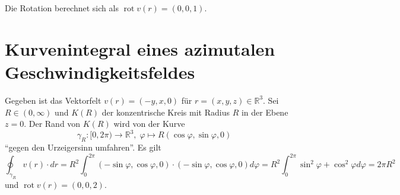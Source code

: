 \documentclass[11pt]{article}
\theoremstyle{plain}
\theoremstyle{definition}
\newcommand{\R}{\mathbb{R}}
\newcommand{\ph}{\varphi}
\newcommand{\longto}{\longrightarrow}
\newcommand{\rot}{\operatorname{rot}}
\begin{document}
Die Rotation berechnet sich als $\rot v(r) = (0,0,1)$.


\section{Kurvenintegral eines azimutalen Geschwindigkeitsfeldes}
Gegeben ist das Vektorfelt $v(r) = (-y, x, 0)$ für $r = (x,y,z) \in \R^3$. Sei $R \in (0, \infty)$ und $K(R)$ der konzentrische Kreis mit Radius $R$ in der Ebene $z = 0$. Der Rand von $K(R)$ wird von der Kurve
\[ \gamma_R : [0, 2\pi) \longto \R^3, \; \ph \longmapsto R (\cos\ph, \sin\ph, 0) \]
``gegen den Urzeigersinn umfahren''. Es gilt
\[ \oint_{\gamma_R} v(r) \cdot dr = R^2 \int_0^{2\pi} (-\sin\ph, \cos\ph, 0) \cdot (-\sin\ph, \cos\ph, 0) d\ph = R^2 \int_0^{2\pi} \sin^2 \ph + \cos^2 \ph d\ph = 2\pi R^2 \]
und $\rot v(r) = (0,0,2)$.
\end{document}
